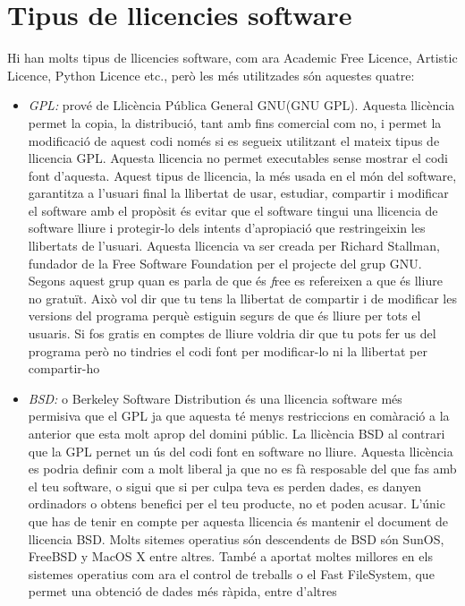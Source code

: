 \section{Tipus de llicencies software}
Hi han molts tipus de llicencies software, com ara Academic Free Licence, Artistic Licence, Python Licence etc., però les més utilitzades són aquestes quatre:
\begin{itemize}
	\item \emph{GPL:} prové de Llicència Pública General GNU(GNU GPL). Aquesta llicència permet la copia, 		la distribució, tant amb fins comercial com no, i permet la modificació de aquest codi només si es 		segueix utilitzant el mateix tipus de llicencia GPL. Aquesta llicencia no permet executables sense 		mostrar el codi font d'aquesta. Aquest tipus de llicencia, la més usada en el món del software, 	garantitza a l'usuari final la llibertat de usar, estudiar, compartir i modificar el software amb el 		propòsit és evitar que el software tingui una llicencia de software lliure i protegir-lo dels intents 		d'apropiació que restringeixin les llibertats de l'usuari. Aquesta llicencia va ser creada per Richard 		Stallman, fundador de la Free Software Foundation per el projecte del grup GNU.
	Segons aquest grup quan es parla de que és \textit free es refereixen a que és lliure no gratuït. Això 		vol dir que tu tens la llibertat de compartir i de modificar les versions del programa perquè estiguin 		segurs	de que és lliure per tots el usuaris. Si fos gratis en comptes de lliure voldria dir que tu 	pots fer us del programa però no tindries el codi font per modificar-lo ni la llibertat per compartir-ho
	\item \emph{BSD:} o Berkeley Software Distribution és una llicencia software més permisiva que el GPL 		ja que aquesta té menys restriccions en comàració a la anterior que esta molt aprop del domini públic. 		La llicència BSD al contrari que la GPL pernet un ús del codi font en software no lliure. Aquesta 		llicència es podria definir com a molt liberal ja que no es fà resposable del que fas amb el teu 		software, o sigui que si per culpa teva es perden dades, es danyen ordinadors o obtens benefici per el 		teu producte, no et poden acusar. L'únic que has de tenir en compte per aquesta llicencia és mantenir 		el document de llicencia BSD. Molts sitemes operatius són descendents de BSD són SunOS, FreeBSD y 		MacOS X entre altres. També a aportat moltes millores en els sistemes operatius com ara el control de 		treballs o el Fast FileSystem, que permet una obtenció de dades més ràpida, entre d'altres

\end{itemize}

